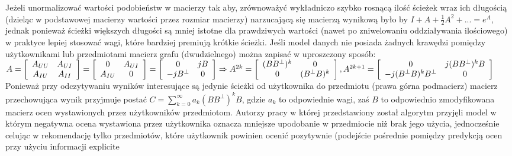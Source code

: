 \documentclass{pracamgr}
\begin{document}
    Jeżeli unormalizować wartości podobieństw w macierzy tak aby, zrównoważyć wykładniczo szybko rosnącą ilość ścieżek wraz ich długością
    (dzieląc w podstawowej macierzy wartości przez rozmiar macierzy) narzucającą się macierzą wynikową było by $I+A+\frac{1}{2}A^2+...=e^{A}$,
    jednak ponieważ ścieżki większych długości są mniej istotne dla prawdziwych wartości (nawet po zniwelowaniu oddziaływania ilościowego)
    w praktyce lepiej stosować wagi, które bardziej premiują krótkie ścieżki.
    Jeśli model danych nie posiada żadnych krawędzi pomiędzy użytkownikami lub przedmiotami macierz grafu (dwudzielnego)
    można zapisać w uproszczony sposób:\newline
    $A=
     \left[\begin{array}{cc}
     A_{UU}&A_{UI}\\
     A_{IU}&A_{II}
     \end{array}\right]
     =
     \left[\begin{array}{cc}
     0&A_{UI}\\
     A_{IU}&0
     \end{array}\right]
     =
     \left[\begin{array}{cc}
     0&jB\\
     -jB^\bot&0
     \end{array}\right]
     \Rightarrow\newline
     A^{2k}=
     \left[\begin{array}{cc}
     (BB^\bot)^k&0\\
     0&(B^\bot B)^k
     \end{array}\right],
     A^{2k+1}=
     \left[\begin{array}{cc}
     0&j(BB^\bot)^kB\\
     -j(B^\bot B)^kB^\bot&0
     \end{array}\right]
    $\newline
    Ponieważ przy odczytywaniu wyników interesujące są jedynie ścieżki od użytkownika do przedmiotu (prawa górna podmacierz)
    macierz przechowująca wynik przyjmuje postać $C=\sum\limits_{k=0}^{\infty}a_k(BB^\bot)^kB$, gdzie $a_k$ to odpowiednie wagi,
    zaś $B$ to odpowiednio zmodyfikowana macierz ocen wystawionych przez użytkowników przedmiotom.
    Autorzy pracy w której przedstawiony został algorytm przyjęli model w którym negatywna ocena wystawiona przez użytkownika
    oznacza mniejsze upodobanie w przedmiocie niż brak jego użycia, jednocześnie celując w rekomendację tylko przedmiotów,
    które użytkownik powinien ocenić pozytywnie (podejście pośrednie pomiędzy predykcją ocen przy użyciu informacji explicite
\end{document}
